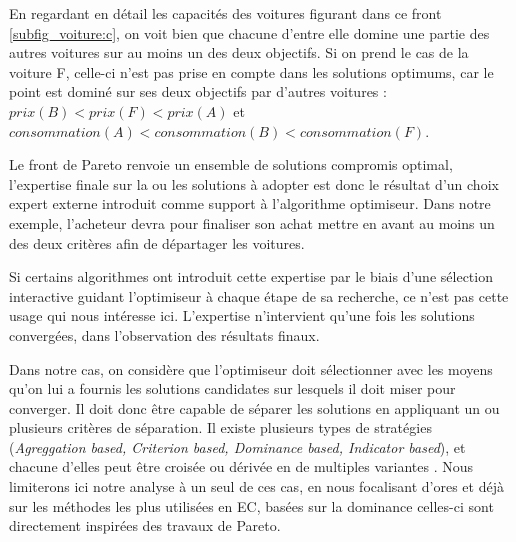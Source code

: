 \sloppy En regardant en détail les capacités des voitures figurant dans ce front \ref{subfig_voiture:c}, on voit bien que chacune d'entre elle domine une partie des autres voitures sur au moins un des deux objectifs. Si on prend le cas de la voiture F, celle-ci n'est pas prise en compte dans les solutions optimums, car le point est dominé sur ses deux objectifs par d'autres voitures : $ prix(B) < prix(F) < prix(A) $ et $consommation(A) < consommation (B) < consommation(F)$.

Le front de Pareto renvoie un ensemble de solutions compromis optimal, l'expertise finale sur la ou les solutions à adopter est donc le résultat d'un choix expert externe introduit comme support à l'algorithme optimiseur. Dans notre exemple, l'acheteur devra pour finaliser son achat mettre en avant au moins un des deux critères afin de départager les voitures.

Si certains algorithmes ont introduit cette expertise par le biais d'une sélection interactive guidant l'optimiseur à chaque étape de sa recherche, ce n'est pas cette usage qui nous intéresse ici. L'expertise n'intervient qu'une fois les solutions convergées, dans l'observation des résultats finaux.

Dans notre cas, on considère que l'optimiseur doit sélectionner avec les moyens qu'on lui a fournis les solutions candidates sur lesquels il doit miser pour converger. Il doit donc être capable de séparer les solutions en appliquant un ou plusieurs critères de séparation. Il existe plusieurs types de stratégies (\textit{Agreggation based, Criterion based, Dominance based, Indicator based}), et chacune d'elles peut être croisée ou dérivée en de multiples variantes \autocites[28]{Zitzler1999a, Deb2001}[7]{Liefooghe2009}. Nous limiterons ici notre analyse à un seul de ces cas, en nous focalisant d'ores et déjà sur les méthodes les plus utilisées en EC, basées sur la dominance celles-ci sont directement inspirées des travaux de Pareto.




